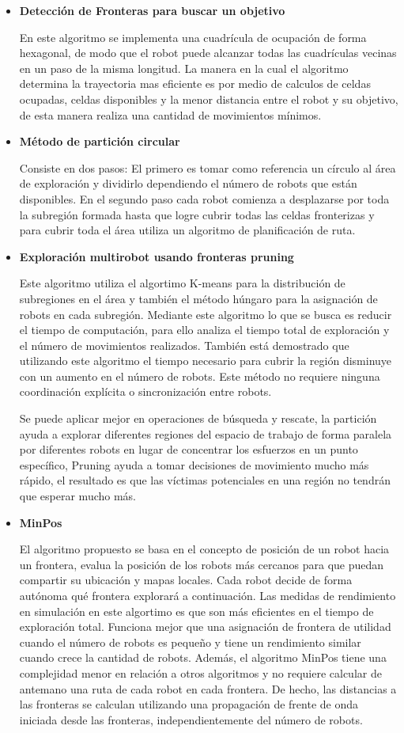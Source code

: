 \documentclass[12pt,a4paper]{article}
\begin{document}
\begin{itemize}
\item
\textbf{Detección de Fronteras para buscar un objetivo}

En este algoritmo se implementa una cuadrícula de ocupación de forma hexagonal, de modo que el robot puede alcanzar todas las cuadrículas vecinas en un paso de la misma longitud. 
La manera en la cual el algoritmo determina la trayectoria mas eficiente es por medio de calculos de celdas ocupadas, celdas disponibles y la menor distancia entre el robot y su objetivo, de esta manera realiza una cantidad de movimientos mínimos.
\item
\textbf{Método de partición circular}

Consiste en dos pasos: El primero es tomar como referencia un círculo al área de exploración y dividirlo dependiendo el número de robots que están disponibles.
En el segundo paso cada robot comienza a desplazarse por toda la subregión formada hasta que logre cubrir todas las celdas fronterizas y para cubrir toda el área utiliza un algoritmo de planificación de ruta.

\item
\textbf{Exploración multirobot usando fronteras pruning}

Este algoritmo utiliza el algortimo K-means para la distribución de subregiones en el área y también el método húngaro para la asignación de robots en cada subregión. Mediante este algoritmo lo que se busca es reducir el tiempo de computación, para ello analiza el tiempo total de exploración y el número de movimientos realizados.
También está demostrado que utilizando este algoritmo el tiempo necesario para cubrir la región disminuye con un aumento en el número de robots. Este método no requiere ninguna coordinación explícita o sincronización entre robots.

Se puede aplicar mejor en operaciones de búsqueda y rescate, la partición ayuda a explorar diferentes regiones del espacio de trabajo de forma paralela por diferentes robots en lugar de concentrar los esfuerzos en un punto específico, Pruning ayuda a tomar decisiones de movimiento mucho más rápido, el resultado es que las víctimas potenciales en una región no tendrán que esperar mucho más.

\item
\textbf{MinPos}

El algoritmo propuesto se basa en el concepto de posición de un robot hacia un
frontera, evalua la posición de los robots más cercanos para que puedan compartir su ubicación y mapas locales. Cada robot decide de forma autónoma qué frontera explorará a continuación.
Las medidas de rendimiento en simulación  en este algortimo es que son más eficientes en el tiempo de exploración total. Funciona mejor que una asignación de frontera de utilidad cuando el número de robots es pequeño y tiene un rendimiento similar cuando crece la cantidad de robots. Además, el algoritmo MinPos tiene una complejidad menor en relación a otros algoritmos y no requiere calcular de antemano una ruta de cada robot en cada frontera. De hecho, las distancias a las fronteras se calculan utilizando una propagación de frente de onda iniciada desde las fronteras, independientemente del número de robots.


\end{itemize}
\end{document}
